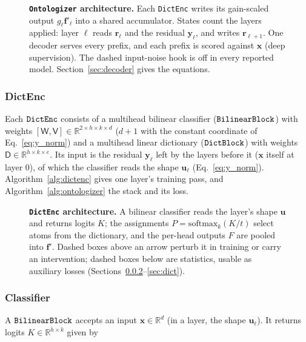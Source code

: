 \begin{figure}[tp]
\centering
\resizebox{\linewidth}{!}{}
\caption[\texttt{Ontologizer} architecture]{\textbf{\texttt{Ontologizer} architecture.}
	Each \texttt{DictEnc} writes its gain-scaled output
	$g_\ell\mathbf{f}'_\ell$ into a shared accumulator. States count the
	layers applied: layer $\ell$ reads $\mathbf{r}_\ell$ and the residual
	$\mathbf{y}_\ell$, and writes $\mathbf{r}_{\ell+1}$. One decoder serves
	every prefix, and each prefix is scored against $\mathbf{x}$ (deep
	supervision). The dashed input-noise hook is off in every reported
	model. Section~\ref{sec:decoder} gives the equations.}
\label{fig:onto-stack}
\end{figure}

\subsubsection{DictEnc}
\label{sec:dictenc}
Each $\mathop{\mathtt{DictEnc}}\limits$ consists of a multihead bilinear classifier
($\mathop{\mathtt{BilinearBlock}}\limits$) with weights
$[\mathsf{W}, \mathsf{V}] \in \mathbb{R}^{2 \times h \times k \times d}$
($d+1$ with the constant coordinate of Eq.~\eqref{eq:y_norm})
and a multihead linear dictionary ($\mathop{\mathtt{DictBlock}}\limits$)
with weights $\mathsf{D} \in \mathbb{R}^{h \times k \times e}$.
Its input is the residual $\mathbf{y}_\ell$ left by the layers before it
($\mathbf{x}$ itself at layer 0), of which the classifier reads the
shape $\mathbf{u}_\ell$ (Eq.~\eqref{eq:y_norm}).
Algorithm~\ref{alg:dictenc} gives one layer's training pass, and
Algorithm~\ref{alg:ontologizer} the stack and its loss.



\begin{figure}[tp]
\centering
\resizebox{\linewidth}{!}{}
\caption[\texttt{DictEnc} architecture]{\textbf{\texttt{DictEnc} architecture.}
	A bilinear classifier reads the layer's shape $\mathbf{u}$ and
	returns logits $K$; the assignments $P = \mathrm{softmax}_k(K/t)$
	select atoms from the dictionary, and the per-head outputs $F$ are
	pooled into $\mathbf{f}'$. Dashed boxes above an arrow perturb it in
	training or carry an intervention; dashed boxes below are statistics,
	usable as auxiliary losses (Sections~\ref{sec:bilinear}--\ref{sec:dict}).}
\label{fig:dictenc}
\end{figure}

\subsubsection{Classifier}
\label{sec:bilinear}
A $\mathop{\mathtt{BilinearBlock}}\limits$ accepts an input $\mathbf{x} \in \mathbb{R}^d$ (in a
layer, the shape $\mathbf{u}_\ell$).
It returns logits $K \in \mathbb{R}^{h \times k}$ given by

